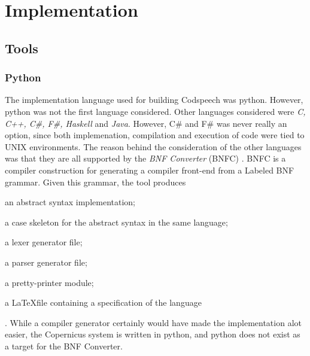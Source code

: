\chapter{Implementation}\label{chap:implementation}


%
%
%

\section{Tools}

\subsection{Python}
The implementation language used for building Codspeech was
python. However, python was not the first language considered. Other
languages considered were \emph{C, C++, C\#, F\#, Haskell} and
\emph{Java}. However, C\# and F\# was never really an option, since
both implemenation, compilation and execution of code were tied to
UNIX environments. The reason behind the consideration of the other
languages was that they are all supported by the \emph{BNF Converter}
(BNFC) \citep{bnfc:online}. BNFC is a compiler construction for
generating a compiler front-end from a Labeled BNF grammar. Given this
grammar, the tool produces
\begin{inparaenum}[(1)]
\item an abstract syntax implementation;
\item a case skeleton for the abstract syntax in the same language;
\item a lexer generator file;
\item a parser generator file;
\item a pretty-printer module;
\item a \LaTeX file containing a specification of the language
\end{inparaenum} \citep{bnfc:online}.
While a compiler generator certainly would have made the
implementation alot easier, the Copernicus system is written in
python, and python does not exist as a target for the BNF Converter.

